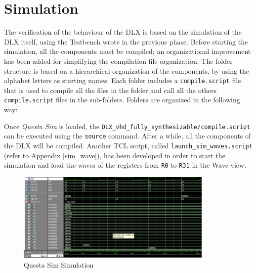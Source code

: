 \section{Simulation}
The verification of the behaviour of the DLX is based on the simulation of the DLX itself, using the Testbench wrote in the previous phase. Before starting the simulation, all the components must be compiled; an organizational improvement has been added for simplifying the compilation file organization. The folder structure is based on a hierarchical organization of the components, by using the alphabet letters as starting names. Each folder includes a \texttt{compile.script} file that is used to compile all the files in the folder and call all the others \texttt{compile.script} files in the sub-folders. Folders are organized in the following way:

\hfill


\hfill


Once \textit{Questa Sim} is loaded, the \texttt{DLX\_vhd\_fully\_synthesizable/compile.script} can be executed using the \texttt{source} command. After a while, all the components of the DLX will be compiled. Another TCL script, called \texttt{launch\_sim\_waves.script} (refer to Appendix \ref{sim_wave}), has been developed in order to start the simulation and load the waves of the registers from \texttt{R0} to \texttt{R31} in the Wave view.

\begin{figure}[H]   
    \centering
    \includegraphics[width=0.85\textwidth]{chapters/8_TestingVerification/images/simulation.png}
    \caption{Questa Sim Simulation}
    \label{fig:simulation}
\end{figure}

